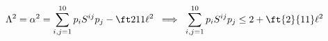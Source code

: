 \begin{equation}
\Lambda^2 = \alpha^2 = \sum_{i,j=1}^{10} p_i S^{ij} p_j - \ft2{11}\ell^2 \;\;
\Longrightarrow  \;\; \sum_{i,j=1}^{10} p_i S^{ij} p_j \leq 2+\ft{2}{11}\ell^2
\end{equation}

